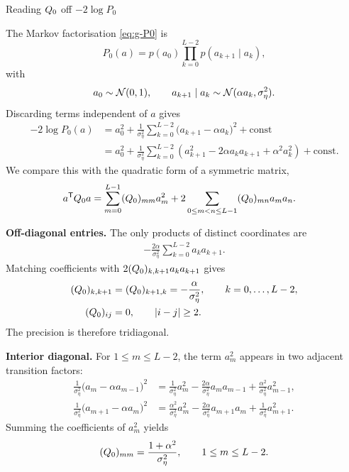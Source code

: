 \begin{toolbox}{Reading $Q_0$ off $-2\log P_0$}

The Markov factorisation \eqref{eq:g-P0} is
\begin{equation*}
  P_0(a)
  =
  p(a_0)
  \prod_{k=0}^{L-2}p(a_{k+1}\mid a_k),
\end{equation*}
with
\[
  a_0\sim\mathcal{N}(0,1),
  \qquad
  a_{k+1}\mid a_k
  \sim\mathcal{N}(\alpha a_k,\sigma_\eta^2).
\]
Discarding terms independent of $a$ gives
\begin{align}
  -2\log P_0(a)
  &=
  a_0^2
  +
  \frac{1}{\sigma_\eta^2}
  \sum_{k=0}^{L-2}
  \bigl(a_{k+1}-\alpha a_k\bigr)^2
  +\mathrm{const}
  \label{eq:g-precision-expand-1}\\
  &=
  a_0^2
  +
  \frac{1}{\sigma_\eta^2}
  \sum_{k=0}^{L-2}
  \left(
    a_{k+1}^2
    -2\alpha a_ka_{k+1}
    +\alpha^2a_k^2
  \right)
  +\mathrm{const}.
  \label{eq:g-precision-expand-2}
\end{align}
We compare this with the quadratic form of a symmetric matrix,
\begin{align}
  a^{\mathsf{T}}Q_0 a
  &=
  \sum_{m=0}^{L-1}(Q_0)_{mm}a_m^2
  +
  2\sum_{0\leq m<n\leq L-1}
  (Q_0)_{mn}a_ma_n.
  \label{eq:g-general-quadratic-form}
\end{align}

\medskip
\noindent\textbf{Off-diagonal entries.}
The only products of distinct coordinates are
\begin{align}
  -\frac{2\alpha}{\sigma_\eta^2}
  \sum_{k=0}^{L-2}a_ka_{k+1}.
\end{align}
Matching coefficients with
$2(Q_0)_{k,k+1}a_ka_{k+1}$ gives
\begin{align}
  (Q_0)_{k,k+1}
  &=
  (Q_0)_{k+1,k}
  =
  -\frac{\alpha}{\sigma_\eta^2},
  \qquad k=0,\ldots,L-2,
  \label{eq:g-precision-offdiag}\\
  (Q_0)_{ij}
  &=0,
  \qquad |i-j|\geq2.
  \label{eq:g-precision-distant-zero}
\end{align}
The precision is therefore tridiagonal.

\medskip
\noindent\textbf{Interior diagonal.}
For $1\leq m\leq L-2$, the term $a_m^2$ appears in two adjacent transition
factors:
\begin{align}
  \frac{1}{\sigma_\eta^2}\bigl(a_m-\alpha a_{m-1}\bigr)^2
  &= \frac{1}{\sigma_\eta^2}a_m^2 - \frac{2\alpha}{\sigma_\eta^2}a_m a_{m-1} + \frac{\alpha^2}{\sigma_\eta^2}a_{m-1}^2,\\
  \frac{1}{\sigma_\eta^2}\bigl(a_{m+1}-\alpha a_m\bigr)^2
  &= \frac{\alpha^2}{\sigma_\eta^2}a_m^2 - \frac{2\alpha}{\sigma_\eta^2}a_{m+1}a_m + \frac{1}{\sigma_\eta^2}a_{m+1}^2.
\end{align}
Summing the coefficients of $a_m^2$ yields
\begin{equation}
  (Q_0)_{mm}
  =
  \frac{1+\alpha^2}{\sigma_\eta^2},
  \qquad
  1\leq m\leq L-2.
  \label{eq:g-precision-interior}
\end{equation}


\end{toolbox}
